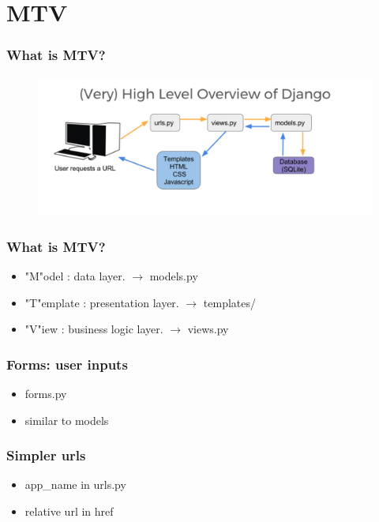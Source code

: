 \documentclass{beamer}
\begin{document}
\section{MTV}
\begin{frame}
\frametitle{What is MTV?}

\begin{figure}
	\includegraphics[width=\linewidth]{Pics/High_level.png}
\end{figure}
\end{frame}

\begin{frame}
\frametitle{What is MTV?}

\begin{block}
	
	\begin{itemize}
		\item "M"odel : data layer. $\rightarrow$ models.py 
		\item "T"emplate : presentation layer. $\rightarrow$ templates/
		\item "V"iew : business logic layer. $\rightarrow$ views.py 
		
	\end{itemize}
\end{block}
\end{frame}

\begin{frame}
	\frametitle{Forms: user inputs}
	\begin{itemize}
		\centering
		\large
		\item forms.py
		\item similar to models
	\end{itemize}
\end{frame}

\begin{frame}
	\frametitle{Simpler urls}
	\begin{itemize}
		\centering
		\large
		\item app\_name in urls.py
		\item relative url in href
	\end{itemize}
\end{frame}
\end{document}
